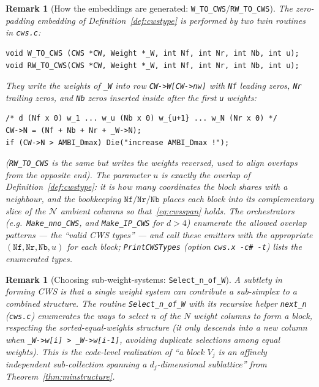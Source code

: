 \documentclass{amsart}
\newtheorem{remark}[theorem]{Remark}
\begin{document}
\begin{remark}[How the embeddings are generated:
\texttt{W\_TO\_CWS}/\texttt{RW\_TO\_CWS}]\label{rmk:wtocws}
The zero-padding embedding of Definition~\ref{def:cwstype} is performed by
two twin routines in \texttt{cws.c}:
\begin{verbatim}
void W_TO_CWS (CWS *CW, Weight *_W, int Nf, int Nr, int Nb, int u);
void RW_TO_CWS(CWS *CW, Weight *_W, int Nf, int Nr, int Nb, int u);
\end{verbatim}
They write the weights of \texttt{\_W} into row \texttt{CW->W[CW->nw]} with
\texttt{Nf} leading zeros, \texttt{Nr} trailing zeros, and \texttt{Nb} zeros
inserted \emph{inside} after the first \texttt{u} weights:
\begin{verbatim}
/* d (Nf x 0) w_1 ... w_u (Nb x 0) w_{u+1} ... w_N (Nr x 0) */
CW->N = (Nf + Nb + Nr + _W->N);
if (CW->N > AMBI_Dmax) Die("increase AMBI_Dmax !");
\end{verbatim}
(\texttt{RW\_TO\_CWS} is the same but writes the weights \emph{reversed}, used
to align overlaps from the opposite end). The parameter $u$ is exactly the
\emph{overlap} of Definition~\ref{def:cwstype}: it is how many coordinates
the block shares with a neighbour, and the bookkeeping
$\texttt{Nf}/\texttt{Nr}/\texttt{Nb}$ places each block into its
complementary slice of the $\mathcal N$ ambient columns so
that~\eqref{eq:cwsspan} holds. The orchestrators (e.g.\
\texttt{Make\_nno\_CWS}, and \texttt{Make\_IP\_CWS} for $d>4$) enumerate the
allowed overlap patterns --- the ``valid CWS types'' --- and call these
emitters with the appropriate $(\texttt{Nf},\texttt{Nr},\texttt{Nb},u)$ for
each block; \texttt{PrintCWSTypes} (option \texttt{cws.x -c\# -t}) lists the
enumerated types.
\end{remark}

\begin{remark}[Choosing sub-weight-systems: \texttt{Select\_n\_of\_W}]
\label{rmk:select}
A subtlety in forming CWS is that a single weight system can contribute a
\emph{sub-simplex} to a combined structure. The routine
\texttt{Select\_n\_of\_W} with its recursive helper \texttt{next\_n}
(\texttt{cws.c}) enumerates the ways to select $n$ of the $N$ weight columns
to form a block, respecting the sorted-equal-weights structure (it only
descends into a new column when \texttt{\_W->w[i] > \_W->w[i-1]}, avoiding
duplicate selections among equal weights). This is the code-level
realization of ``a block $V_j$ is an affinely independent sub-collection
spanning a $d_j$-dimensional sublattice'' from
Theorem~\ref{thm:minstructure}.
\end{remark}
\end{document}
